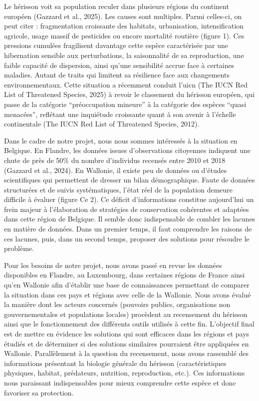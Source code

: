 Le hérisson voit sa population reculer dans plusieurs régions du continent européen (Gazzard et al., 2025). Les causes sont multiples. Parmi celles-ci, on peut citer : fragmentation croissante des habitats, urbanisation, intensification agricole, usage massif de pesticides ou encore mortalité routière (figure 1). Ces pressions cumulées fragilisent davantage cette espèce caractérisée par une hibernation sensible aux perturbations, la saisonnalité de sa reproduction, une faible capacité de dispersion, ainsi qu’une sensibilité accrue face à certaines maladies. Autant de traits qui limitent sa résilience face aux changements environnementaux. Cette situation a récemment conduit l’\gls{uicn} (The IUCN Red List of Threatened Species, 2025) à revoir le classement du hérisson européen, qui passe de la catégorie “préoccupation mineure” à la catégorie des espèces “quasi menacées”, reflétant une inquiétude croissante quant à son avenir à l’échelle continentale (The IUCN Red List of Threatened Species, 2012). 

Dans le cadre de notre projet, nous nous sommes intéressés à la situation en Belgique. En Flandre, les données issues d’observations citoyennes indiquent une chute de près de 50\% du nombre d’individus recensés entre 2010 et 2018 (Gazzard et al., 2024). En Wallonie, il existe peu de données ou d’études scientifiques qui permettent de dresser un bilan démographique. Faute de données structurées et de suivis systématiques, l’état réel de la population demeure difficile à évaluer (figure Ce 2). Ce déficit d’informations constitue aujourd’hui un frein majeur à l’élaboration de stratégies de conservation cohérentes et adaptées dans cette région de Belgique. Il semble donc indispensable de combler les lacunes en matière de données. Dans un premier temps, il faut comprendre les raisons de ces lacunes, puis, dans un second temps, proposer des solutions pour résoudre le problème.  

Pour les besoins de notre projet, nous avons passé en revue les données disponibles en Flandre, au Luxembourg, dans certaines régions de France ainsi qu’en Wallonie afin d’établir une base de connaissances permettant de comparer la situation dans ces pays et régions avec celle de la Wallonie. Nous avons évalué la manière dont les acteurs concernés (pouvoirs publics, organisations non gouvernementales et populations locales) procèdent au recensement du hérisson ainsi que le fonctionnement des différents outils utilisés à cette fin. L’objectif final est de mettre en évidence les solutions qui sont efficaces dans les régions et pays étudiés et de déterminer si des solutions similaires pourraient être appliquées en Wallonie. Parallèlement à la question du recensement, nous avons rassemblé des informations présentant la biologie générale du hérisson (caractéristiques physiques, habitat, prédateurs, nutrition, reproduction, etc.). Ces informations nous paraissant indispensables pour mieux comprendre cette espèce et donc favoriser sa protection. 

